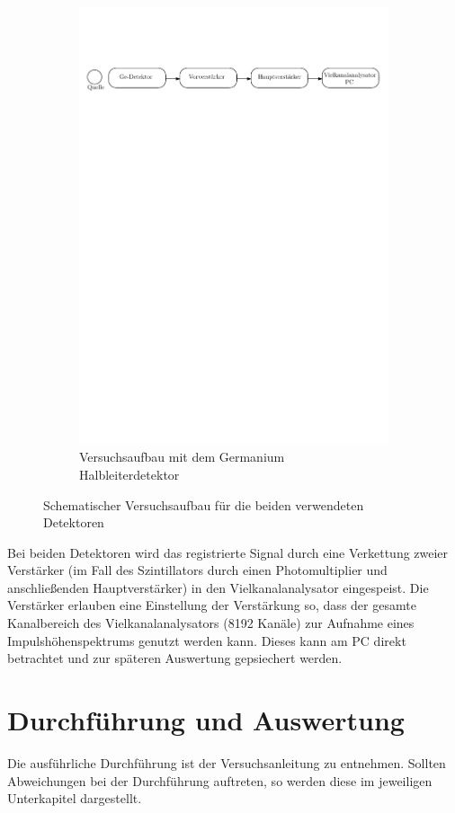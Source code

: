 \documentclass[11pt, a4paper]{article}
\numberwithin{equation}{section}
\begin{document}
\begin{figure}[ht]
\begin{subfigure}{\textwidth}
		\includegraphics[width=\textwidth]{./figures/aufbau_halb.pdf}
		\caption{Versuchsaufbau mit dem Germanium Halbleiterdetektor}	
	\end{subfigure}
	\caption{Schematischer Versuchsaufbau für die beiden verwendeten Detektoren}
	\label{fig:aufbau}
\end{figure}
Bei beiden Detektoren wird das registrierte Signal durch eine Verkettung zweier Verstärker (im Fall des Szintillators durch einen Photomultiplier und anschließenden Hauptverstärker) in den Vielkanalanalysator eingespeist.
Die Verstärker erlauben eine Einstellung der Verstärkung so, dass der gesamte Kanalbereich des Vielkanalanalysators (\num{8192} Kanäle) zur Aufnahme eines Impulshöhenspektrums genutzt werden kann.
Dieses kann am PC direkt betrachtet und zur späteren Auswertung gepsiechert werden.

\section{Durchführung und Auswertung}
Die ausführliche Durchführung ist der Versuchsanleitung \cite{anleitung} zu entnehmen.
Sollten Abweichungen bei der Durchführung auftreten, so werden diese im jeweiligen Unterkapitel dargestellt.
\end{document}
